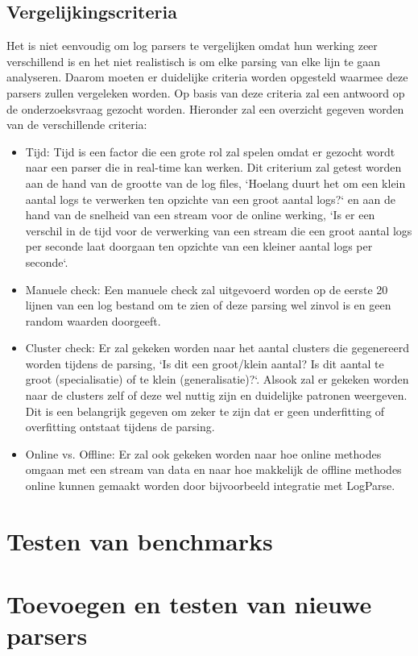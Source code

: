 \subsection{Vergelijkingscriteria}
Het is niet eenvoudig om log parsers te vergelijken omdat hun werking zeer verschillend is en het niet realistisch is om elke parsing van elke lijn te gaan analyseren. Daarom moeten er duidelijke criteria worden opgesteld waarmee deze parsers zullen vergeleken worden. Op basis van deze criteria zal een antwoord op de onderzoeksvraag gezocht worden. Hieronder zal een overzicht gegeven worden van de verschillende criteria:
\begin{itemize}
    \item Tijd: Tijd is een factor die een grote rol zal spelen omdat er gezocht wordt naar een parser die in real-time kan werken. Dit criterium zal getest worden aan de hand van de grootte van de log files, `Hoelang duurt het om een klein aantal logs te verwerken ten opzichte van een groot aantal logs?` en aan de hand van de snelheid van een stream voor de online werking, `Is er een verschil in de tijd voor de verwerking van een stream die een groot aantal logs per seconde laat doorgaan ten opzichte van een kleiner aantal logs per seconde`.\\
    
    \item Manuele check: Een manuele check zal uitgevoerd worden op de eerste 20 lijnen van een log bestand om te zien of deze parsing wel zinvol is en geen random waarden doorgeeft.\\
    
    \item Cluster check: Er zal gekeken worden naar het aantal clusters die gegenereerd worden tijdens de parsing, `Is dit een groot/klein aantal? Is dit aantal te groot (specialisatie) of te klein (generalisatie)?`. Alsook zal er gekeken worden naar de clusters zelf of deze wel nuttig zijn en duidelijke patronen weergeven. Dit is een belangrijk gegeven om zeker te zijn dat er geen underfitting of overfitting ontstaat tijdens de parsing.\\
    
    \item Online vs. Offline: Er zal ook gekeken worden naar hoe online methodes omgaan met een stream van data en naar hoe makkelijk de offline methodes online kunnen gemaakt worden door bijvoorbeeld integratie met LogParse.
\end{itemize}



\section{Testen van benchmarks}

\section{Toevoegen en testen van nieuwe parsers}

